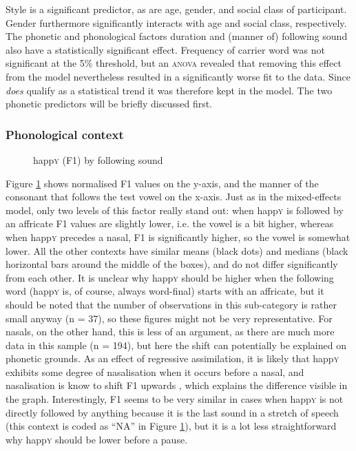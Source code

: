 Style is a significant predictor, as are age, gender, and social class of participant.
Gender furthermore significantly interacts with age and social class, respectively.
The phonetic and phonological factors duration and (manner of) following sound also have a statistically significant effect.
Frequency of carrier word was not significant at the 5\% threshold, but an \textsc{anova} revealed that removing this effect from the model nevertheless resulted in a significantly worse fit to the data.
Since  \emph{does} qualify as a statistical trend it was therefore kept in the model.
The two phonetic predictors will be briefly discussed first.

			\subsubsection{Phonological context}
			\label{sec.prod.res.vow.happy.f1.phon}

	\begin{figure}[h!]
		\centering
		\resizebox{0.5\linewidth}{!}{} 
		\caption{happ\textsc{y} (F1) by following sound}
		\label{fig.box.f1w.happy.follsound}
	\end{figure}

Figure \ref{fig.box.f1w.happy.follsound} shows normalised F1 values on the y-axis, and the manner of the consonant that follows the test vowel on the x-axis.
Just as in the mixed-effects model, only two levels of this factor really stand out: when happ\textsc{y} is followed by an affricate F1 values are slightly lower, i.e. the vowel is a bit higher, whereas when happ\textsc{y} precedes a nasal, F1 is significantly higher, so the vowel is somewhat lower.
All the other contexts have similar means (black dots) and medians (black horizontal bars around the middle of the boxes), and do not differ significantly from each other.
It is unclear why happ\textsc{y} should be higher when the following word (happ\textsc{y} is, of course, always word-final) starts with an affricate, but it should be noted that the number of observations in this sub-category is rather small anyway (n = 37), so these figures might not be very representative.
For nasals, on the other hand, this is less of an argument, as there are much more data in this sample (n = 194), but here the shift can potentially be explained on phonetic grounds.
As an effect of regressive assimilation, it is likely that happ\textsc{y} exhibits some degree of nasalisation when it occurs before a nasal, and nasalisation is know to shift F1 upwards \parencite{housestevens1956}, which explains the difference visible in the graph.
Interestingly, F1 seems to be very similar in cases when happ\textsc{y} is not directly followed by anything because it is the last sound in a stretch of speech (this context is coded as ``NA'' in Figure \ref{fig.box.f1w.happy.follsound}), but it is a lot less straightforward why happ\textsc{y} should be lower before a pause.

